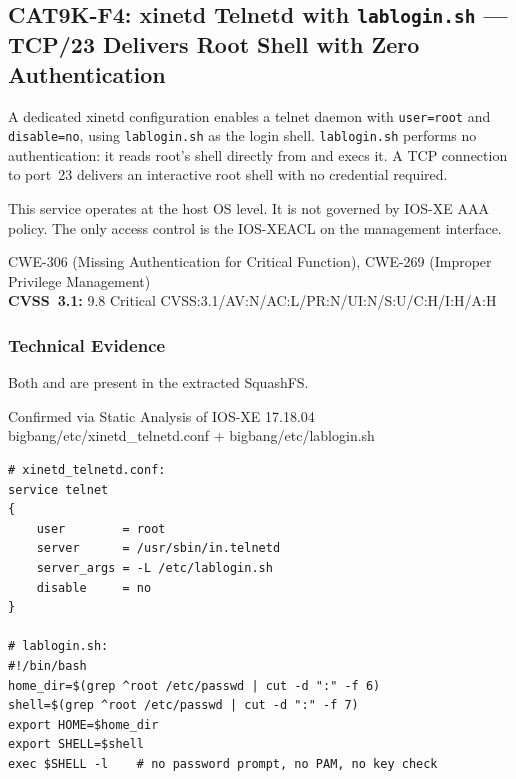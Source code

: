 \documentclass[11pt,a4paper]{article}
\begin{document}
\subsection{CAT9K-F4: xinetd Telnetd with \texorpdfstring{\texttt{lablogin.sh}}{lablogin.sh} --- TCP/23 Delivers Root Shell with Zero Authentication}

\begin{overviewbox}
A dedicated xinetd configuration enables a telnet daemon with \texttt{user=root} and
\texttt{disable=no}, using \texttt{lablogin.sh} as the login shell.
\texttt{lablogin.sh} performs no authentication: it reads root's shell directly from
 and execs it. A TCP connection to port~23 delivers an interactive
root shell with no credential required.

This service operates at the host OS level. It is not governed by IOS-XE AAA policy.
The only access control is the IOS-XE\@ ACL on the management interface.

CWE-306 (Missing Authentication for Critical Function), CWE-269 (Improper Privilege Management)\\
\textbf{CVSS~3.1:} 9.8 Critical \quad CVSS:3.1/AV:N/AC:L/PR:N/UI:N/S:U/C:H/I:H/A:H
\end{overviewbox}

\subsubsection{Technical Evidence}

Both  and  are
present in the extracted SquashFS.

\begin{pocbox}{Confirmed via Static Analysis of IOS-XE 17.18.04 bigbang/etc/xinetd\_telnetd.conf + bigbang/etc/lablogin.sh}
\begin{lstlisting}[style=bash]
# xinetd_telnetd.conf:
service telnet
{
    user        = root
    server      = /usr/sbin/in.telnetd
    server_args = -L /etc/lablogin.sh
    disable     = no
}

# lablogin.sh:
#!/bin/bash
home_dir=$(grep ^root /etc/passwd | cut -d ":" -f 6)
shell=$(grep ^root /etc/passwd | cut -d ":" -f 7)
export HOME=$home_dir
export SHELL=$shell
exec $SHELL -l    # no password prompt, no PAM, no key check
\end{lstlisting}
\end{pocbox}
\end{document}
